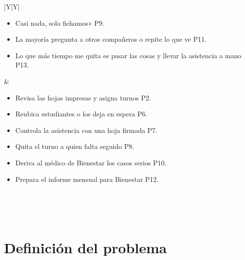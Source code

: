 \documentclass[12pt,a4paper]{article}
\begin{document}
\begin{table}[H]
\begin{tabularx}{\textwidth}{|Y|Y|}
\begin{itemize}[leftmargin=*,noitemsep,topsep=0pt,before=\vspace{-0.9\baselineskip},after=\vspace{-\baselineskip}]
  \item  Casi nada, solo fichamos» P9.
  \item  La mayoría pregunta a otros compañeros o repite lo que ve P11.
  \item  Lo que más tiempo me quita es pasar las cosas y llevar la asistencia a mano P13.
\end{itemize}
&
\begin{itemize}[leftmargin=*,noitemsep,topsep=0pt,before=\vspace{-0.9\baselineskip},after=\vspace{-\baselineskip}]
  \item Revisa las hojas impresas y asigna turnos P2.
  \item Reubica estudiantes o los deja en espera P6.
  \item Controla la asistencia con una hoja firmada P7.
  \item Quita el turno a quien falta seguido P8.
  \item Deriva al médico de Bienestar los casos serios P10.
  \item Prepara el informe mensual para Bienestar P12.
\end{itemize}
\\
\hline
{} \\
\hline
{} \\
\hline
\end{tabularx}
\caption{Mapa de empatía del promotor del Gimnasio Universitario}
\end{table}

\section{Definición del problema}
\end{document}
